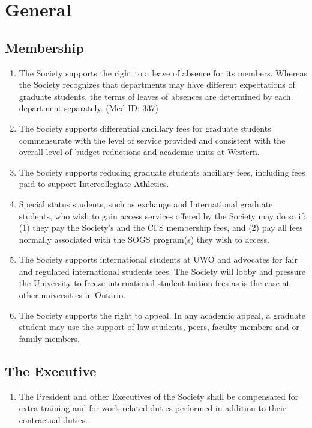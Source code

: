 \section{General}
\subsection{Membership}
\begin{enumerate}
\item 	The Society supports the right to a leave of absence for its members. Whereas the Society recognizes that departments may have different expectations of graduate students, the terms of leaves of absences are determined by each department separately. (Med ID: 337)
\item  The Society supports differential ancillary fees for graduate students commensurate with the level of service provided and consistent with the overall level of budget reductions and academic units at Western. 
\item 	The Society supports reducing graduate students ancillary fees, including fees paid to support Intercollegiate Athletics.
\item 	Special status students, such as exchange and International graduate students, who wish to gain access services offered by the Society may do so if: (1) they pay the Society's and the CFS membership fees, and (2) pay all fees normally associated with the SOGS program(s) they wish to access. 
\item 	The Society supports international students at UWO and advocates for fair and regulated international students fees. The Society will lobby and pressure the University to freeze international student tuition fees as is the case at other universities in Ontario. 
\item 	The Society supports the right to appeal. In any academic appeal, a graduate student may use the support of law students, peers, faculty members and or family members. 
\end{enumerate}

\subsection{The Executive}
\begin{enumerate}
\item 	The President and other Executives of the Society shall be compensated for extra training and for work-related duties performed in addition to their contractual duties. 
\end{enumerate}


